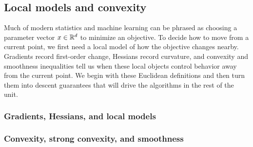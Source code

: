 \subsection{Local models and convexity}
\label{subsec:optimization-euclidean}

Much of modern statistics and machine learning can be phrased as choosing a parameter vector $x\in\mathbb{R}^d$ to minimize an objective.
To decide how to move from a current point, we first need a local model of how the objective changes nearby.
Gradients record first-order change, Hessians record curvature, and convexity and smoothness inequalities tell us when these local objects control behavior away from the current point.
We begin with these Euclidean definitions and then turn them into descent guarantees that will drive the algorithms in the rest of the unit.

\subsubsection{Gradients, Hessians, and local models}



\subsubsection{Convexity, strong convexity, and smoothness}
\label{subsec:convex-strongconvex-smooth}


